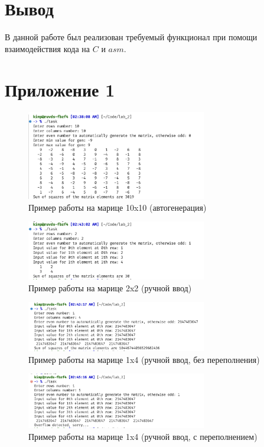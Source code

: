 \documentclass[a4paper]{article}
\begin{document}
  \section{Вывод}

  В данной работе был реализован требуемый функционал при помощи взаимодействия кода
  на $C$ и $asm$.

  \newpage
  \section{Приложение 1}

  \begin{figure}[H]
    \centering
    \includegraphics[width=0.7\textwidth]{lab_21.png}
    \caption{Пример работы на марице 10x10 (автогенерация)}
  \end{figure}

  \begin{figure}[H]
    \centering
    \includegraphics[width=0.7\textwidth]{lab_22.png}
    \caption{Пример работы на марице 2x2 (ручной ввод)}
  \end{figure}

  \begin{figure}[H]
    \centering
    \includegraphics[width=0.7\textwidth]{lab_23.png}
    \caption{Пример работы на марице 1x4 (ручной ввод, без переполнения)}
  \end{figure}

  \begin{figure}[H]
    \centering
    \includegraphics[width=0.7\textwidth]{lab_24.png}
    \caption{Пример работы на марице 1x4 (ручной ввод, с переполнением)}
  \end{figure}
\end{document}
